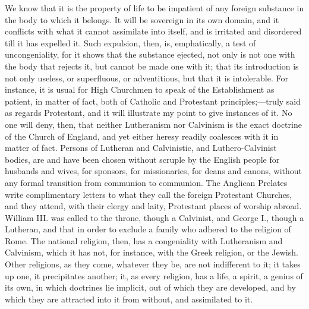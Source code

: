 We know that it is the property of life to be impatient of any
foreign substance in the body to which it belongs. It will be
sovereign in its own domain, and it conflicts with what it cannot
assimilate into itself, and is irritated and disordered till it has
expelled it. Such expulsion, then, is, emphatically, a test of
uncongeniality, for it shows that the substance ejected, not only is
not one with the body that rejects it, but cannot be made one with it;
that its introduction is not only useless, or superfluous, or
adventitious, but that it is intolerable. For instance, it is usual
for High Churchmen to speak of the Establishment as patient, in matter
of fact, both of Catholic and Protestant principles;—truly said as
regards Protestant, and it will illustrate my point to give instances
of it. No one will deny, then, that neither Lutheranism nor Calvinism
is the exact doctrine of the Church of England, and yet either heresy
readily coalesces with it in matter of fact. Persons of Lutheran and
Calvinistic, and Luthero-Calvinist bodies, are and have been chosen
without scruple by the English people for husbands and wives, for
sponsors, for missionaries, for deans and canons, without any formal
transition from communion to communion. The Anglican Prelates write
complimentary letters to what they call the foreign Protestant
Churches, and they attend, with their clergy and laity, Protestant
places of worship abroad. William III. was called to the throne,
though a Calvinist, and George I., though a Lutheran, and that in
order to exclude a family who adhered to the religion of Rome. The
national religion, then, has a congeniality with Lutheranism and
Calvinism, which it has not, for instance, with the Greek religion, or
the Jewish. Other religions, as they come, whatever they be, are not
indifferent to it; it takes up one, it precipitates another; it, as
every religion, has a life, a spirit, a genius of its own, in which
doctrines lie implicit, out of which they are developed, and by which
they are attracted into it from without, and assimilated to it.

